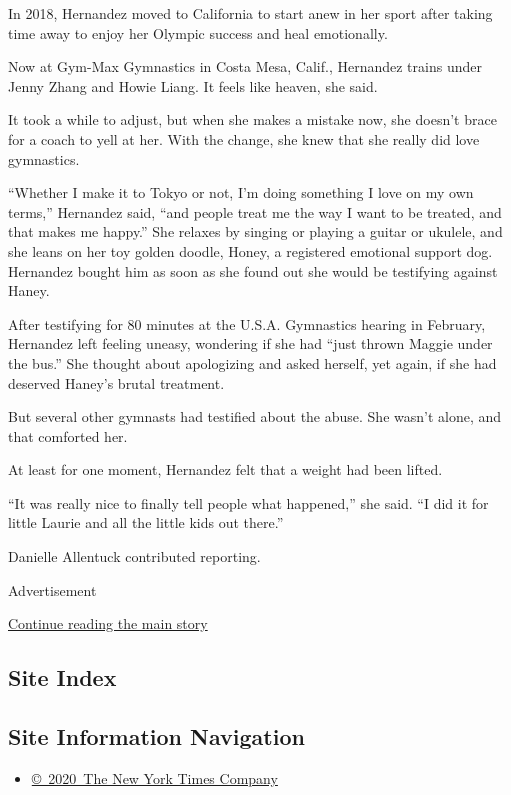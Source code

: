 In 2018, Hernandez moved to California to start anew in her sport after
taking time away to enjoy her Olympic success and heal emotionally.

Now at Gym-Max Gymnastics in Costa Mesa, Calif., Hernandez trains under
Jenny Zhang and Howie Liang. It feels like heaven, she said.

It took a while to adjust, but when she makes a mistake now, she doesn't
brace for a coach to yell at her. With the change, she knew that she
really did love gymnastics.

``Whether I make it to Tokyo or not, I'm doing something I love on my
own terms,'' Hernandez said, ``and people treat me the way I want to be
treated, and that makes me happy.'' She relaxes by singing or playing a
guitar or ukulele, and she leans on her toy golden doodle, Honey, a
registered emotional support dog. Hernandez bought him as soon as she
found out she would be testifying against Haney.

After testifying for 80 minutes at the U.S.A. Gymnastics hearing in
February, Hernandez left feeling uneasy, wondering if she had ``just
thrown Maggie under the bus.'' She thought about apologizing and asked
herself, yet again, if she had deserved Haney's brutal treatment.

But several other gymnasts had testified about the abuse. She wasn't
alone, and that comforted her.

At least for one moment, Hernandez felt that a weight had been lifted.

``It was really nice to finally tell people what happened,'' she said.
``I did it for little Laurie and all the little kids out there.''

Danielle Allentuck contributed reporting.

Advertisement

\protect\hyperlink{after-bottom}{Continue reading the main story}

\hypertarget{site-index}{%
\subsection{Site Index}\label{site-index}}

\hypertarget{site-information-navigation}{%
\subsection{Site Information
Navigation}\label{site-information-navigation}}

\begin{itemize}
\tightlist
\item
  \href{https://help.nytimes.com/hc/en-us/articles/115014792127-Copyright-notice}{©~2020~The
  New York Times Company}
\end{itemize}

